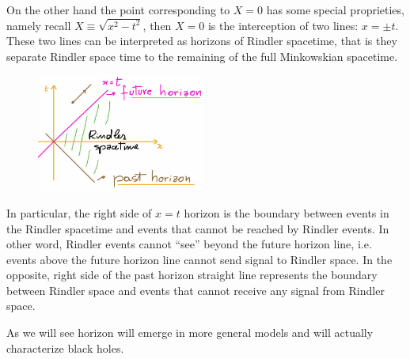 \documentclass[../main/main.tex]{subfiles}
\begin{document}
On the other hand the point corresponding to $X=0$ has some special proprieties, namely recall $X\equiv\sqrt{x^2-t^2}$, then $X=0$ is the interception of two lines: $x=\pm t$. These two lines can be interpreted as horizons of Rindler spacetime, that is they separate Rindler space time to the remaining of the full Minkowskian spacetime. 
\begin{figure}[H]
\centering
\includegraphics[width=5.5cm]{../img/rindler-horizons.jpg}
\end{figure}
\noindent In particular, the right side of $x=t$ horizon is the boundary between events in the Rindler spacetime and events that cannot be reached by Rindler events. In other word, Rindler events cannot ``see'' beyond the future horizon line, i.e. events above the future horizon line cannot send signal to Rindler space. In the opposite, right side of the past horizon straight line represents the boundary between Rindler space and events that cannot receive any signal from Rindler space. 

As we will see horizon will emerge in more general models and will actually characterize black holes.
\end{document}
